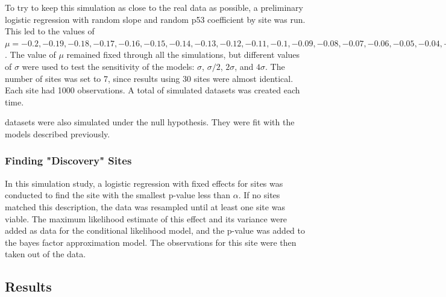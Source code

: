 \documentclass[AMA,STIX1COL]{WileyNJD-v2}\usepackage[]{graphicx}\usepackage[]{color}
\begin{document}
To try to keep this simulation as close to the real data as possible, a preliminary logistic regression with random slope and random p53 coefficient by site was run. This led to the values of $\mu =-0.2, -0.19, -0.18, -0.17, -0.16, -0.15, -0.14, -0.13, -0.12, -0.11, -0.1, -0.09, -0.08, -0.07, -0.06, -0.05, -0.04, -0.03, -0.02, -0.01, 0, 0.01, 0.02, 0.03, 0.04, 0.05, 0.06, 0.07, 0.08, 0.09, 0.1, 0.11, 0.12, 0.13, 0.14, 0.15, 0.16, 0.17, 0.18, 0.19, 0.2, 0.21, 0.22, 0.23, 0.24, 0.25, 0.26, 0.27, 0.28, 0.29, 0.3, 0.31, 0.32, 0.33, 0.34, 0.35, 0.36, 0.37, 0.38, 0.39, 0.4, 0.41, 0.42, 0.43, 0.44, 0.45, 0.46, 0.47, 0.48, 0.49, 0.5, 0.51, 0.52, 0.53, 0.54, 0.55, 0.56, 0.57, 0.58, 0.59, 0.6, 0.61, 0.62, 0.63, 0.64, 0.65, 0.66, 0.67, 0.68, 0.69, 0.7, 0.71, 0.72, 0.73, 0.74, 0.75, 0.76, 0.77, 0.78, 0.79, 0.8, 0.81, 0.82, 0.83, 0.84, 0.85, 0.86, 0.87, 0.88, 0.89, 0.9, 0.91, 0.92, 0.93, 0.94, 0.95, 0.96, 0.97, 0.98, 0.99, 1, 1.01, 1.02, 1.03, 1.04, 1.05, 1.06, 1.07, 1.08, 1.09, 1.1, 1.11, 1.12, 1.13, 1.14, 1.15, 1.16, 1.17, 1.18, 1.19, 1.2, 1.21, 1.22, 1.23, 1.24, 1.25, \sigma^2 = $. The value of $\mu$ remained fixed through all the simulations, but different values of $\sigma$ were used to test the sensitivity of the models: $\sigma$, $\sigma/2$, $2\sigma$, and  $4\sigma$. The number of sites was set to 7, since results using 30 sites were almost identical. Each site had 1000 observations. A total of  simulated datasets was created each time.


 datasets were also simulated under the null hypothesis. They were fit with the models described previously. 

\subsubsection{Finding "Discovery" Sites}

In this simulation study, a logistic regression with fixed effects for sites was conducted to find the site with the smallest p-value less than $\alpha$. If no sites matched this description, the data was resampled until at least one site was viable. The maximum likelihood estimate of this effect and its variance were added as data for the conditional likelihood model, and the p-value was added to the bayes factor approximation model.  The observations for this site were then taken out of the data.

\subsection{Results}
\end{document}
